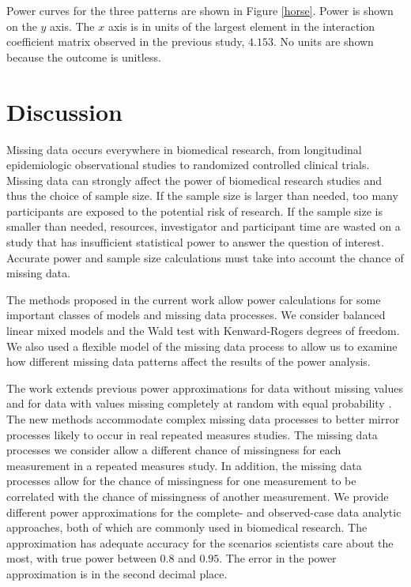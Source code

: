\documentclass[11pt]{article}
\begin{document}
Power curves for the three patterns are shown in Figure \ref{horse}. Power is shown on the $y$ axis. The $x$ axis is in units of the largest element in the interaction coefficient matrix observed in the previous study, $4.153$. No units are shown because the outcome is unitless.

\section{Discussion}
\label{discussion}

Missing data occurs everywhere in biomedical research, from longitudinal epidemiologic observational studies to randomized controlled clinical trials. Missing data can strongly affect the power of biomedical research studies and thus the choice of sample size. If the sample size is larger than needed, too many participants are exposed to the potential risk of research. If the sample size is smaller than needed, resources, investigator and participant time are wasted on a study that has insufficient statistical power to answer the question of interest. Accurate power and sample size calculations must take into account the chance of missing data.

The methods proposed in the current work allow power calculations for some important classes of models and missing data processes. We consider balanced linear mixed models and the Wald test with Kenward-Rogers degrees of freedom. We also used a flexible model of the missing data process to allow us to examine how different missing data patterns affect the results of the power analysis.

The work extends previous power approximations for data without missing values \cite{muller_statistical_2007, edwards_r2_2008} and for data with values missing completely at random with equal probability \cite{ringham_multivariate_2016}. The new methods accommodate complex missing data processes \cite{qaqish_family_2003} to better mirror processes likely to occur in real repeated measures studies. The missing data processes we consider allow a different chance of missingness for each measurement in a repeated measures study. In addition, the missing data processes allow for the chance of missingness for one measurement to be correlated with the chance of missingness of another measurement. We provide different power approximations for the complete- and observed-case data analytic approaches, both of which are commonly used in biomedical research. The approximation has adequate accuracy for the scenarios scientists care about the most, with true power between $0.8$ and $0.95$. The error in the power approximation is in the second decimal place.
\end{document}
